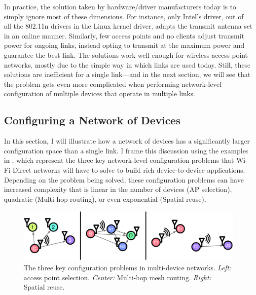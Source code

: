 In practice, the solution taken by hardware/driver manufacturers today is to simply ignore most of these dimensions. For instance, only Intel's  driver, out of all the 802.11n drivers in the Linux kernel driver, adapts the transmit antenna set in an online manner. Similarly, few access points and no clients adjust transmit power for ongoing links, instead opting to transmit at the maximum power and guarantee the best link. The solutions work well enough for wireless access point networks, mostly due to the simple way in which links are used today. Still, these solutions are inefficient for a single link---and in the next section, we will see that the problem gets even more complicated when performing network-level configuration of multiple devices that operate in multiple links.

\subsection{Configuring a Network of Devices}
\label{sec:intro_network_problems}
In this section, I will illustrate how a network of devices has a significantly larger configuration space than a single link. I frame this discussion using the examples in , which represent the three key network-level configuration problems that Wi-Fi Direct networks will have to solve to build rich device-to-device applications. Depending on the problem being solved, these configuration problems can have increased complexity that is linear in the number of devices (AP selection), quadratic (Multi-hop routing), or even exponential (Spatial reuse).

\begin{figure}[tp]
	\centering
	\includegraphics[width=\textwidth]{figures/network}
	\caption{\label{fig:network_examples} The three key configuration problems in multi-device networks. \textit{Left:} access point selection. \textit{Center:} Multi-hop mesh routing. \textit{Right:} Spatial reuse. }
\end{figure}

